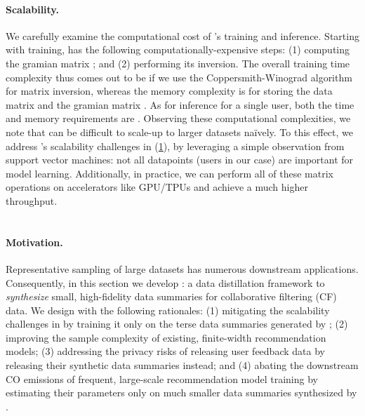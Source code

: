 \documentclass{article}
\begin{document}
\paragraph{Scalability.} We carefully examine the computational cost of \model's training and inference. Starting with training, \model has the following computationally-expensive steps: (1) computing the gramian matrix ; and (2) performing its inversion. The overall training time complexity thus comes out to be  if we use the Coppersmith-Winograd algorithm \cite{matrix_inverse} for matrix inversion, whereas the memory complexity is  for storing the data matrix  and the gramian matrix . As for inference for a single user, both the time and memory requirements are . Observing these computational complexities, we note that \model can be difficult to scale-up to larger datasets na\"ively. To this effect, we address \model's scalability challenges in \sampler (\cref{sec:distillation}), by leveraging a simple observation from support vector machines: not all datapoints (users in our case) are important for model learning. Additionally, in practice, we can perform all of these matrix operations on accelerators like GPU/TPUs and achieve a much higher throughput.

\section{\sampler} \label{sec:distillation}
\paragraph{Motivation.} 
Representative sampling of large datasets has numerous downstream applications. Consequently, in this section we develop \sampler: a data distillation framework to \emph{synthesize} small, high-fidelity data summaries for collaborative filtering (CF) data. We design \sampler with the following rationales: (1) mitigating the scalability challenges in \model by training it only on the terse data summaries generated by \sampler; (2) improving the sample complexity of existing, finite-width recommendation models; (3) addressing the privacy risks of releasing user feedback data by releasing their synthetic data summaries instead; and (4) abating the downstream CO emissions of frequent, large-scale recommendation model training by estimating their parameters only on much smaller data summaries synthesized by \sampler. 
\end{document}
